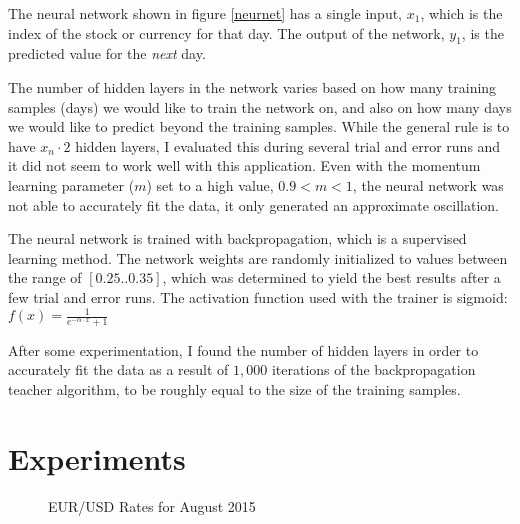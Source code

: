 \documentclass[a4paper,12pt]{article}
\begin{document}
	The neural network shown in figure \ref{neurnet} has a single input, $x_1$, which is the index of the stock or currency for that day. The output of the network, $y_1$, is the predicted value for the \textit{next} day.
	
	The number of hidden layers in the network varies based on how many training samples (days) we would like to train the network on, and also on how many days we would like to predict beyond the training samples. While the general rule is to have $x_n \cdot 2$ hidden layers, I evaluated this during several trial and error runs and it did not seem to work well with this application. Even with the momentum learning parameter ($m$) set to a high value, $0.9 < m < 1$, the neural network was not able to accurately fit the data, it only generated an approximate oscillation.
	
	The neural network is trained with backpropagation, which is a supervised learning method. The network weights are randomly initialized to values between the range of $[0.25..0.35]$, which was determined to yield the best results after a few trial and error runs. The activation function used with the trainer is sigmoid: $f(x) = \frac{1}{e^{-\alpha \cdot x} + 1}$
	
	After some experimentation, I found the number of hidden layers in order to accurately fit the data as a result of $1,000$ iterations of the backpropagation teacher algorithm, to be roughly equal to the size of the training samples.

\section{Experiments}

	\begin{figure}[!htbp]
		\centering
		\caption{EUR/USD Rates for August 2015}
		\label{eurusd2015}
	\end{figure}
	
\end{document}
